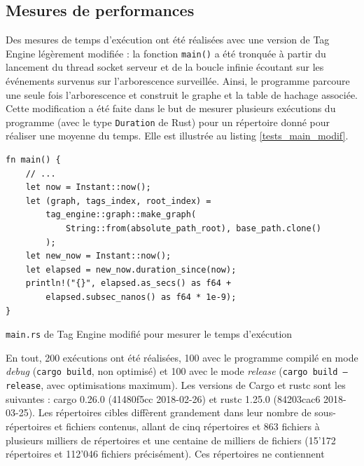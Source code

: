 \subsection{Mesures de performances}\label{mesures_performances}
Des mesures de temps d'exécution ont été réalisées avec une version de Tag Engine légèrement modifiée :
la fonction \texttt{main()} a été tronquée à partir du lancement du thread socket serveur et de la boucle infinie 
écoutant sur les événements survenus sur l'arborescence surveillée. Ainsi, le programme parcoure 
une seule fois l'arborescence et construit le graphe et la table de hachage associée. Cette modification 
a été faite dans le but de mesurer plusieurs exécutions du programme (avec le type \texttt{Duration} de Rust) 
pour un répertoire donné pour réaliser une moyenne du temps. Elle est illustrée au listing \ref{tests_main_modif}. 
\bigbreak
\begin{code}
    \begin{verbatim}
fn main() {
    // ...
    let now = Instant::now();
    let (graph, tags_index, root_index) = 
        tag_engine::graph::make_graph(
            String::from(absolute_path_root), base_path.clone()
        );
    let new_now = Instant::now();
    let elapsed = new_now.duration_since(now);
    println!("{}", elapsed.as_secs() as f64 + 
        elapsed.subsec_nanos() as f64 * 1e-9);
}
    \end{verbatim}
    \caption{\texttt{main.rs} de Tag Engine modifié pour mesurer le temps d'exécution}
    \label{tests_main_modif}
\end{code}
\bigbreak
En tout, 200 exécutions ont été réalisées, 100 avec le programme compilé 
en mode \textit{debug} (\texttt{cargo build}, non optimisé) et 100 avec le mode 
\textit{release} (\texttt{cargo build --release}, avec optimisations maximum).
Les versions de Cargo et rustc sont les suivantes : cargo 0.26.0 (41480f5cc 2018-02-26) et rustc 1.25.0 (84203cac6 2018-03-25).
Les répertoires cibles diffèrent grandement dans leur nombre de sous-répertoires et fichiers contenus, allant 
de cinq répertoires et 863 fichiers à plusieurs milliers de répertoires et une centaine de milliers 
de fichiers (15'172 répertoires et 112'046 fichiers précisément). Ces répertoires ne contiennent 
